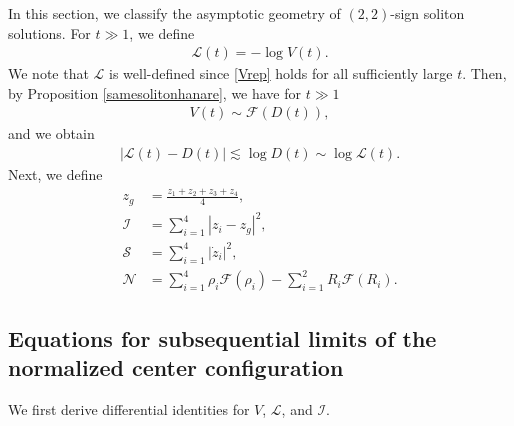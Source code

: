 \documentclass[10pt,a4paper]{amsart}
\numberwithin{equation}{section}
\begin{document}
In this section, we classify the asymptotic geometry of $(2,2)$-sign soliton solutions. For $t\gg 1$, we define
\begin{align}\label{Ldef}
\mathcal{L}(t)=-\log{V(t)}.
\end{align}
We note that $\mathcal{L}$ is well-defined since \eqref{Vrep} holds for all sufficiently large $t$. Then, by Proposition \ref{samesolitonhanare}, we have for $t\gg 1$
\begin{align}\label{VsimmathcalF}
V(t)\sim \mathcal{F}(D(t)),
\end{align}
and we obtain
\begin{align}\label{mathcalLsim}
\left|\mathcal{L}(t)-D(t)\right|\lesssim \log{D(t)}\sim \log{\mathcal{L}(t)}.
\end{align}
Next, we define 
\begin{align}
z_g&=\frac{z_1+z_2+z_3+z_4}{4}, \label{jushindef}
\\
\mathcal{I}&=\sum_{i=1}^4\left|z_i-z_g\right|^2, \label{mathcalI}
\\
\mathcal{S}&=\sum_{i=1}^4\left|\dot{z}_i\right|^2\label{mathcalS},
\\
\mathcal{N}&=\sum_{i=1}^4\rho_i\mathcal{F}(\rho_i)-\sum_{i=1}^2R_i\mathcal{F}(R_i).\label{mathcalN}
\end{align}

\subsection{Equations for subsequential limits of the normalized center configuration}

We first derive differential identities for $V$, $\mathcal{L}$, and $\mathcal{I}$.
\end{document}
